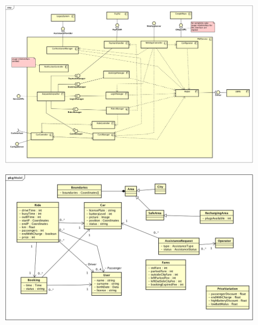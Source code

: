 \documentclass[]{article}
\begin{document}
\includegraphics[width=1.00000\textwidth,height=1.00000\textwidth]{./comp_diagrams/PWEService.png}
\newline

\includegraphics[width=1.00000\textwidth,height=1.00000\textwidth]{./comp_diagrams/Model.png}
\newline
\end{document}
